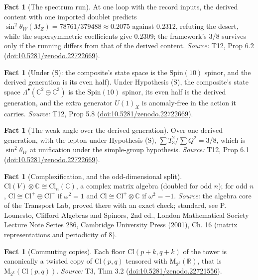 \documentclass[11pt]{article}
\theoremstyle{definition}
\newtheorem{fact}[theorem]{Fact}
\theoremstyle{plain}
\providecommand{\C}{}\renewcommand{\C}{\mathbb{C}}
\providecommand{\Cl}{}\renewcommand{\Cl}{\mathrm{Cl}}
\providecommand{\Mat}{}\renewcommand{\Mat}{\mathrm{M}}
\providecommand{\R}{}\renewcommand{\R}{\mathbb{R}}
\begin{document}
\begin{fact}[The spectrum run]\label{c:standard-model.spectrum-run}
At one loop with the record inputs, the derived content with one imported doublet predicts $\sin^{2}\theta_{W}(M_{Z}) = 78761/379488 \approx 0.2075$ against $0.2312$, refuting the desert, while the supersymmetric coefficients give $0.2309$; the framework's $3/8$ survives only if the running differs from that of the derived content.
\emph{Source:} T12, Prop 6.2 (\href{https://doi.org/10.5281/zenodo.22722669}{doi:10.5281/zenodo.22722669}).
\end{fact}

\begin{fact}[Under (S): the composite's state space is the $\mathrm{Spin}(10)$ spinor, and the derived generation is its even half]\label{c:standard-model.under-s-composites-state-space-spinor}
Under Hypothesis (S), the composite's state space $\Lambda^{\bullet}(\C^{2} \oplus \C^{3})$ is the $\mathrm{Spin}(10)$ spinor, its even half is the derived generation, and the extra generator $U(1)_{X}$ is anomaly-free in the action it carries.
\emph{Source:} T12, Prop 5.8 (\href{https://doi.org/10.5281/zenodo.22722669}{doi:10.5281/zenodo.22722669}).
\end{fact}

\begin{fact}[The weak angle over the derived generation]\label{c:standard-model.weak-angle-over-derived-generation}
Over one derived generation, with the lepton under Hypothesis (S), $\sum T_{3}^{2}/\sum Q^{2} = 3/8$, which is $\sin^{2}\theta_{W}$ at unification under the simple-group hypothesis.
\emph{Source:} T12, Prop 6.1 (\href{https://doi.org/10.5281/zenodo.22722669}{doi:10.5281/zenodo.22722669}).
\end{fact}

\begin{fact}[Complexification, and the odd-dimensional split]\label{c:std-algebra.complexification}
$\Cl(V) \otimes \C \cong \Cl_n(\C)$, a complex matrix algebra (doubled for odd $n$); for odd $n$, $\Cl \cong \Cl^{+} \oplus \Cl^{+}$ if $\omega^{2} = 1$ and $\Cl \cong \Cl^{+} \otimes \C$ if $\omega^{2} = -1$.
\emph{Source:} the algebra core of the Transport Lab, proved there with an exact check; standard, see P. Lounesto, Clifford Algebras and Spinors, 2nd ed., London Mathematical Society Lecture Note Series 286, Cambridge University Press (2001), Ch. 16 (matrix representations and periodicity of 8).
\end{fact}

\begin{fact}[Commuting copies]\label{c:tower.commuting-copies}
Each floor $\Cl(p{+}k, q{+}k)$ of the tower is canonically a twisted copy of $\Cl(p,q)$ tensored with $\Mat_{2^k}(\R)$, that is $\Mat_{2^k}(\Cl(p,q))$.
\emph{Source:} T3, Thm 3.2 (\href{https://doi.org/10.5281/zenodo.22721556}{doi:10.5281/zenodo.22721556}).
\end{fact}
\end{document}
